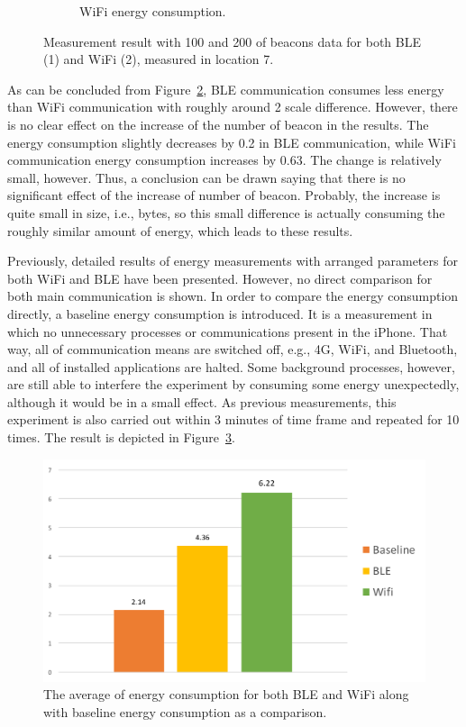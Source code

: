 \documentclass[journal]{vgtc}                %
\begin{document}
\begin{figure}
\begin{subfigure}[b]{0.13\textwidth}
        \caption{WiFi energy consumption.}
        \label{fig:wifi-high-tp}
    \end{subfigure}
    \caption{Measurement result with 100 and 200 of beacons data for both BLE (1) and WiFi (2), measured in location 7.}
    \label{fig:high-throughput}
\end{figure}

As can be concluded from Figure~\ref{fig:high-throughput}, BLE communication consumes less energy than WiFi communication with roughly around 2 scale difference. However, there is no clear effect on the increase of the number of beacon in the results. The energy consumption slightly decreases by 0.2 in BLE communication, while WiFi communication energy consumption increases by 0.63. The change is relatively small, however. Thus, a conclusion can be drawn saying that there is no significant effect of the increase of number of beacon. Probably, the increase is quite small in size, i.e., bytes, so this small difference is actually consuming the roughly similar amount of energy, which leads to these results.

Previously, detailed results of energy measurements with arranged parameters for both WiFi and BLE have been presented. However, no direct comparison for both main communication is shown. In order to compare the energy consumption directly, a baseline energy consumption is introduced. It is a measurement in which no unnecessary processes or communications present in the iPhone. That way, all of communication means are switched off, e.g., 4G, WiFi, and Bluetooth, and all of installed applications are halted. Some background processes, however, are still able to interfere the experiment by consuming some energy unexpectedly, although it would be in a small effect. As previous measurements, this experiment is also carried out within 3 minutes of time frame and repeated for 10 times. The result is depicted in Figure~\ref{fig:baseline-ble-wifi}.

\begin{figure}
  \centering
    \includegraphics[width=.5\textwidth]{baseline-ble-wifi}
  \caption{The average of energy consumption for both BLE and WiFi along with baseline energy consumption as a comparison.}
  \label{fig:baseline-ble-wifi}
\end{figure}
\end{document}
